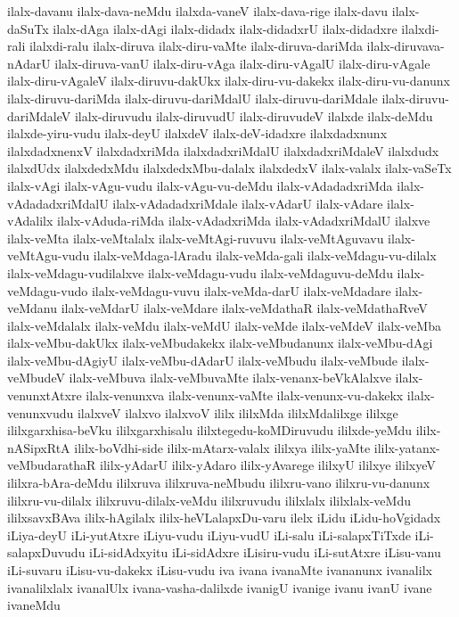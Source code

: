 {ilalx-davanu
ilalx-dava-neMdu
ilalxda-vaneV
ilalx-dava-rige
ilalx-davu
ilalx-daSuTx
ilalx-dAga
ilalx-dAgi
ilalx-didadx
ilalx-didadxrU
ilalx-didadxre
ilalxdi-rali
ilalxdi-ralu
ilalx-diruva
ilalx-diru-vaMte
ilalx-diruva-dariMda
ilalx-diruvava-nAdarU
ilalx-diruva-vanU
ilalx-diru-vAga
ilalx-diru-vAgalU
ilalx-diru-vAgale
ilalx-diru-vAgaleV
ilalx-diruvu-dakUkx
ilalx-diru-vu-dakekx
ilalx-diru-vu-danunx
ilalx-diruvu-dariMda
ilalx-diruvu-dariMdalU
ilalx-diruvu-dariMdale
ilalx-diruvu-dariMdaleV
ilalx-diruvudu
ilalx-diruvudU
ilalx-diruvudeV
ilalxde
ilalx-deMdu
ilalxde-yiru-vudu
ilalx-deyU
ilalxdeV
ilalx-deV-idadxre
ilalxdadxnunx
ilalxdadxnenxV
ilalxdadxriMda
ilalxdadxriMdalU
ilalxdadxriMdaleV
ilalxdudx
ilalxdUdx
ilalxdedxMdu
ilalxdedxMbu-dalalx
ilalxdedxV
ilalx-valalx
ilalx-vaSeTx
ilalx-vAgi
ilalx-vAgu-vudu
ilalx-vAgu-vu-deMdu
ilalx-vAdadadxriMda
ilalx-vAdadadxriMdalU
ilalx-vAdadadxriMdale
ilalx-vAdarU
ilalx-vAdare
ilalx-vAdalilx
ilalx-vAduda-riMda
ilalx-vAdadxriMda
ilalx-vAdadxriMdalU
ilalxve
ilalx-veMta
ilalx-veMtalalx
ilalx-veMtAgi-ruvuvu
ilalx-veMtAguvavu
ilalx-veMtAgu-vudu
ilalx-veMdaga-lAradu
ilalx-veMda-gali
ilalx-veMdagu-vu-dilalx
ilalx-veMdagu-vudilalxve
ilalx-veMdagu-vudu
ilalx-veMdaguvu-deMdu
ilalx-veMdagu-vudo
ilalx-veMdagu-vuvu
ilalx-veMda-darU
ilalx-veMdadare
ilalx-veMdanu
ilalx-veMdarU
ilalx-veMdare
ilalx-veMdathaR
ilalx-veMdathaRveV
ilalx-veMdalalx
ilalx-veMdu
ilalx-veMdU
ilalx-veMde
ilalx-veMdeV
ilalx-veMba
ilalx-veMbu-dakUkx
ilalx-veMbudakekx
ilalx-veMbudanunx
ilalx-veMbu-dAgi
ilalx-veMbu-dAgiyU
ilalx-veMbu-dAdarU
ilalx-veMbudu
ilalx-veMbude
ilalx-veMbudeV
ilalx-veMbuva
ilalx-veMbuvaMte
ilalx-venanx-beVkAlalxve
ilalx-venunxtAtxre
ilalx-venunxva
ilalx-venunx-vaMte
ilalx-venunx-vu-dakekx
ilalx-venunxvudu
ilalxveV
ilalxvo
ilalxvoV
ililx
ililxMda
ililxMdalilxge
ililxge
ililxgarxhisa-beVku
ililxgarxhisalu
ililxtegedu-koMDiruvudu
ililxde-yeMdu
ililx-nASipxRtA
ililx-boVdhi-side
ililx-mAtarx-valalx
ililxya
ililx-yaMte
ililx-yatanx-veMbudarathaR
ililx-yAdarU
ililx-yAdaro
ililx-yAvarege
ililxyU
ililxye
ililxyeV
ililxra-bAra-deMdu
ililxruva
ililxruva-neMbudu
ililxru-vano
ililxru-vu-danunx
ililxru-vu-dilalx
ililxruvu-dilalx-veMdu
ililxruvudu
ililxlalx
ililxlalx-veMdu
ililxsavxBAva
ililx-hAgilalx
ililx-heVLalapxDu-varu
ilelx
iLidu
iLidu-hoVgidadx
iLiya-deyU
iLi-yutAtxre
iLiyu-vudu
iLiyu-vudU
iLi-salu
iLi-salapxTiTxde
iLi-salapxDuvudu
iLi-sidAdxyitu
iLi-sidAdxre
iLisiru-vudu
iLi-sutAtxre
iLisu-vanu
iLi-suvaru
iLisu-vu-dakekx
iLisu-vudu
iva
ivana
ivanaMte
ivananunx
ivanalilx
ivanalilxlalx
ivanalUlx
ivana-vasha-dalilxde
ivanigU
ivanige
ivanu
ivanU
ivane
ivaneMdu
}

